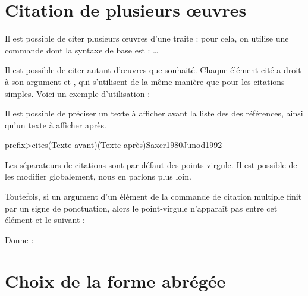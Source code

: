 \section{Citation de plusieurs œuvres}\label{citemultiple}

Il est possible de citer plusieurs œuvres d'une traite : pour cela, on utilise une commande dont la syntaxe de base est :  …

Il est possible de citer autant d'œuvres que souhaité. Chaque élément cité a droit à son argument  et , qui s'utilisent de la même manière que pour les citations simples.
Voici un exemple d'utilisation : 

\begin{latexcode}
\autocites{Saxer1980}{Junod1992}
\end{latexcode}

\begin{quotation}
\cites{Saxer1980}{Junod1992}
\end{quotation}

Il est possible de préciser un texte à afficher avant la liste des des références, ainsi qu'un texte à afficher après.

\begin{latexcode}
\<prefix>cites(Texte avant)(Texte après){Saxer1980}{Junod1992}
\end{latexcode}

Les séparateurs de citations sont par défaut des points-virgule. Il est possible de les modifier globalement, nous en parlons plus loin.

Toutefois, si un argument  d'un élément de la commande de citation multiple finit par un signe de ponctuation, alors le point-virgule n'apparaît pas entre cet élément et le suivant :

\begin{latexcode}
\autocites[on consultera également :]{Saxer1980}{Junod1992}
\end{latexcode}

Donne :

\begin{quotation}
\cites[on consultera également :]{Saxer1980}{Junod1992}
\end{quotation}




\section{Choix de la forme abrégée}\label{shortfields}

